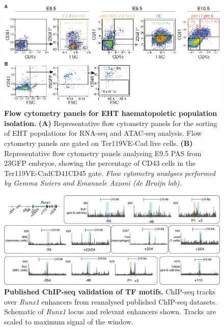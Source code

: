 \begin{figure}[p]
    \centering
    \includegraphics[width=\textwidth,height=\textheight,keepaspectratio]{figures/appendix/app_eht-sort-gates.png}
    \caption[{Flow cytometry panels for EHT haematopoietic population isolation.}]
    {\textbf{Flow cytometry panels for EHT haematopoietic population isolation.} 
    \textbf{(A)} Representative flow cytometry panels for the sorting of EHT populations for RNA-seq and ATAC-seq analysis. Flow cytometry panels are gated on Ter119\uneg{}VE-Cad\upos{} live cells.
    \textbf{(B)} Representative flow cytometry panels analysing E9.5 PAS from 23GFP embryos, showing the percentage of CD43\upos{} cells in the Ter119\uneg{}VE-Cad\upos{}CD41\upos{}CD45\uneg{} gate.
    \textit{Flow cytometry analyses performed by Gemma Swiers and Emanuele Azzoni (de Bruijn lab).}
    }
    \label{fig:app_eht-sort-gates}
\end{figure}
\clearpage


\begin{figure}[p]
    \centering
    \includegraphics[width=\textwidth,height=\textheight,keepaspectratio]{figures/appendix/app_runx1-upstream-chip.png}
    \caption[{Published ChIP-seq validation of TF motifs.}]
    {\textbf{Published ChIP-seq validation of TF motifs.} 
    ChIP-seq tracks over \textit{Runx1} enhancers from reanalysed published ChIP-seq datasets. Schematic of \textit{Runx1} locus and relevant enhancers shown. Tracks are scaled to maximum signal of the window.
    }
    \label{fig:app_runx1-upstream-chip}
\end{figure}
\clearpage

